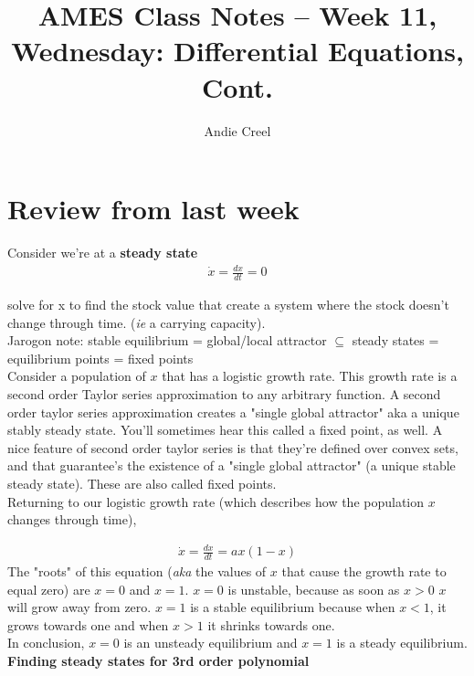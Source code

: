 \documentclass{article}
\title{AMES Class Notes -- Week 11, Wednesday: Differential Equations, Cont.}
\author{Andie Creel}
\begin{document}
\maketitle

\section{Review from last week}
Consider we're at a \textbf{steady state} 
\begin{align*}
    \dot x = \frac{dx}{dt} = 0 
\end{align*}

solve for x to find the stock value that create a system where the stock doesn't change through time. (\textit{ie} a carrying capacity). \\

Jarogon note: stable equilibrium =  global/local attractor $\subseteq$ steady states = equilibrium points  = fixed points \\

Consider a population of $x$ that has a logistic growth rate. This growth rate is a second order Taylor series approximation to any arbitrary function. A second order taylor series approximation creates a "single global attractor" aka a unique stably steady state. You'll sometimes hear this called a fixed point, as well. A nice feature of second order taylor series is that they're defined over convex sets, and that guarantee's the existence of a "single global attractor" (a unique stable steady state). These are also called fixed points.\\

Returning to our logistic growth rate (which describes how the population $x$ changes through time),

\begin{align*}
    \dot x = \frac{dx}{dt} = ax( 1 - x) 
\end{align*}
The "roots" of this equation (\textit{aka} the values of $x$ that cause the growth rate to equal zero) are $x = 0$ and $x = 1$. $x = 0$ is unstable, because as soon as $x>0$ $x$ will grow away from zero. $x = 1$ is a stable equilibrium because when $x<1$, it grows towards one and when $x>1$ it shrinks towards one. \\

In conclusion, $x=0$ is an unsteady equilibrium and $x =1$ is a steady equilibrium. \\

\textbf{Finding steady states for 3rd order polynomial}
\end{document}
